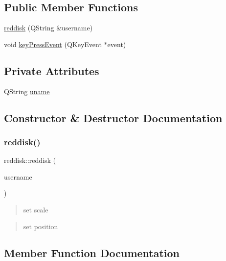 \subsection*{Public Member Functions}
\begin{DoxyCompactItemize}
\item 
\hyperlink{classreddisk_a9d9d68326f53fb5e87af8465ca3081c4}{reddisk} (Q\+String \&username)
\item 
void \hyperlink{classreddisk_af1ec459fcb13a8b354b5a366d0ba2482}{key\+Press\+Event} (Q\+Key\+Event $\ast$event)
\end{DoxyCompactItemize}
\subsection*{Private Attributes}
\begin{DoxyCompactItemize}
\item 
Q\+String \hyperlink{classreddisk_a7bf6c0d696ac4e32cbe6d683c2af07b1}{uname}
\end{DoxyCompactItemize}


\subsection{Constructor \& Destructor Documentation}
\mbox{\label{classreddisk_a9d9d68326f53fb5e87af8465ca3081c4}} 
\subsubsection{\texorpdfstring{reddisk()}{reddisk()}}
{\footnotesize\ttfamily reddisk\+::reddisk (\begin{DoxyParamCaption}\item[{Q\+String \&}]{username }\end{DoxyParamCaption})}

\begin{quote}
set scale \end{quote}


\begin{quote}
set position \end{quote}


\subsection{Member Function Documentation}
\mbox{\label{classreddisk_af1ec459fcb13a8b354b5a366d0ba2482}} 
